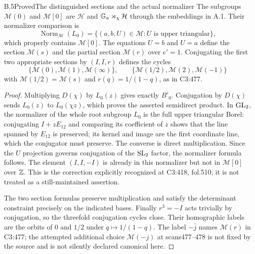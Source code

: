 \begin{statement}{B.5}{Proved}{The distinguished sections and the actual normalizer}
The subgroups $\mathcal M(0)$ and $\mathcal M[0]$ are
$\mathcal H$ and $\mathbb G_a\rtimes_\chi\mathcal H$ through the
embeddings in A.1. Their normalizer comparison is
\[
 \operatorname{Norm}_{\mathcal M}(L_0)
 =\{(a,b,U)\in\mathcal M:U\text{ is upper triangular}\},
\]
which properly contains $\mathcal M[0]$. The equations
$U=b$ and $U=a$ define the section $\mathcal M(s)$ and
the partial section $\mathcal M(r)$ over $e'=1$.
Conjugating the first two appropriate sections by $(I,I,r)$
defines the cycles
\[
 \{\mathcal M(0),\mathcal M(1),\mathcal M(\infty)\},\qquad
 \{\mathcal M(1/2),\mathcal M(2),\mathcal M(-1)\}
\]
with $\mathcal M(1/2)=\mathcal M(s)$ and
$\dot r(q)=1/(1-q)$, as in C3:477.
\end{statement}
\begin{proof}
Multiplying $D(\chi)$ by $L_0(z)$ gives exactly $B'_0$.
Conjugation by $D(\chi)$ sends $L_0(z)$ to $L_0(\chi z)$,
which proves the asserted semidirect product. In $\operatorname{GL}_2$,
the normalizer of the whole root subgroup $L_0$ is the full
upper triangular Borel: conjugating $I+zE_{12}$ and comparing
its coefficient of $z$ shows that the line spanned by
$E_{12}$ is preserved; its kernel and image are the first
coordinate line, which the conjugator must preserve.
The converse is direct multiplication. Since the $U$ projection
governs conjugation of the $\operatorname{SL}_2$ factor, the normalizer
formula follows. The element $(I,I,-I)$ is already in this
normalizer but not in $\mathcal M[0]$ over $\mathbb Z$.
This is the correction explicitly recognized at C3:418,
fol.510; it is not treated as a still-maintained assertion.

The two section formulas preserve multiplication and satisfy
the determinant constraint precisely on the indicated bases.
Finally $r^3=-I$ acts trivially by conjugation, so the
threefold conjugation cycles close. Their homographic labels
are the orbits of $0$ and $1/2$ under $q\mapsto1/(1-q)$.
The label $-\bar j$ names $\mathcal M(r)$ in C3:477;
the attempted additional choice $\mathcal M(-j)$ at
scans477--478 is not fixed by the source and is not silently
declared canonical here.
\end{proof}

